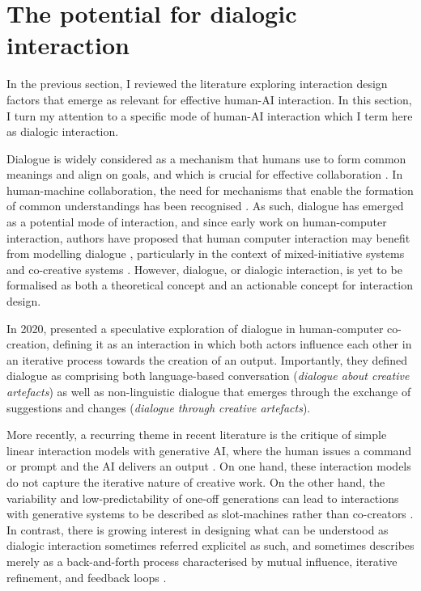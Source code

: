 \section{The potential for dialogic interaction}

In the previous section, I reviewed the literature exploring interaction design factors that emerge as relevant for effective human-AI interaction. In this section, I turn my attention to a specific mode of human-AI interaction which I term here as dialogic interaction.

Dialogue is widely considered as a mechanism that humans use to form common meanings and align on goals, and which is crucial for effective collaboration \cite{Bohm1996-fo}. In human-machine collaboration, the need for mechanisms that enable the formation of common understandings has been recognised \cite{Dafoe2021-in}. As such, dialogue has emerged as a potential mode of interaction, and since early work on human-computer interaction, authors have proposed that human computer interaction may benefit from modelling dialogue \cite{Hayes1983-ca}, particularly in the context of mixed-initiative systems and co-creative systems \cite{Allen1999-sr, Yannakakis2014-zs, Deterding2017-wh}. However, dialogue, or dialogic interaction, is yet to be formalised as both a theoretical concept and an actionable concept for interaction design. 

In 2020, \cite{Bown2020-oc} presented a speculative exploration of dialogue in human-computer co-creation, defining it as an interaction in which both actors influence each other in an iterative process towards the creation of an output. Importantly, they defined dialogue as comprising both language-based conversation (\textit{dialogue about creative artefacts}) as well as non-linguistic dialogue that emerges through the exchange of suggestions and changes (\textit{dialogue through creative artefacts}).

More recently, a recurring theme in recent literature is the critique of simple linear interaction models with generative AI, where the human issues a command or prompt and the AI delivers an output \cite{Zhou2024-vp, Lin2023-jd, Tholander2023-rv}. On one hand, these interaction models do not capture the iterative nature of creative work. On the other hand, the variability and low-predictability of one-off generations can lead to interactions with generative systems to be described as slot-machines rather than co-creators \cite{Dylan2023-ma}. In contrast, there is growing interest in designing what can be understood as dialogic interaction sometimes referred explicitel as such, and sometimes describes merely as a back-and-forth process characterised by mutual influence, iterative refinement, and feedback loops \cite{Bown2020-oc, Gomez2023-bp, Wang2021-uy, Zhou2024-vp, Ghajargar2022-af, Feldman2017-ip}.


